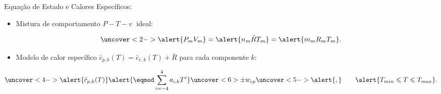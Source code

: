     \begin{frame}{Equação de Estado e Calores Específicos:}\vspace*{-2em}
        \begin{itemize}
            \item<1-> Mistura de comportamento \alert{$P-T-v\;$ ideal}:
        \end{itemize}
        \vspace*{0.8em}\begin{equation*}
            \uncover<2->{
                \alert{P_mV_m} =
                    \alert{n_m\bar{R}T_m} =
                    \alert{m_mR_mT_m}.
            }
        \end{equation*}
        \begin{itemize}
            \item<3-> Modelo de calor específico \alert{$\bar{c}_{p,k}(T) = \bar{c}_{v,k}(T) +
                \bar{R}$} para cada componente \alert{$k$}:
        \end{itemize}
        \vspace*{0.8em}\begin{equation*}
            \uncover<4->{
                \alert{\bar{c}_{p,k}(T)}
                    \alert{\eqmod \sum_{i=-4}^4 a_{i,k}T^i}
                    \uncover<6>{\pm w_{cp}}
                    \uncover<5->{\alert{,}\qquad\alert{T_{min} \leqslant T \leqslant T_{max}}.}
            }
        \end{equation*}
    \end{frame}




